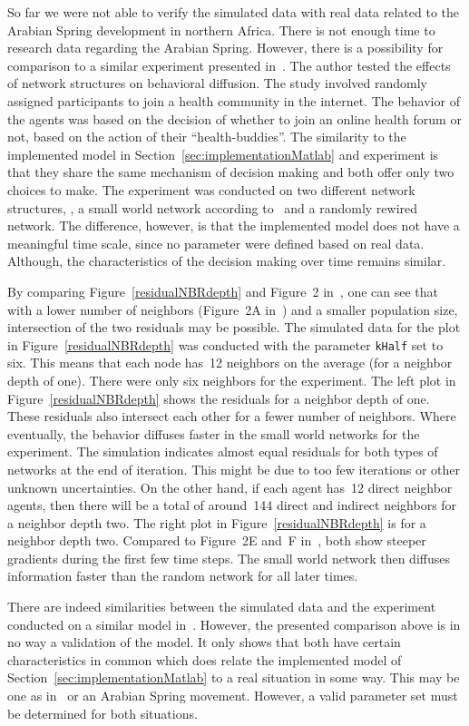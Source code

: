 So far we were not able to verify the simulated data with real data related to
the Arabian Spring development in northern Africa.  There is not enough time to
research data regarding the Arabian Spring.  However, there is a possibility
for comparison to a similar experiment presented in~\cite{centola2010spread}.
The author tested the effects of network structures on behavioral diffusion.
The study involved randomly assigned participants to join a health community in
the internet.  The behavior of the agents was based on the decision of whether
to join an online health forum or not, based on the action of their
``health-buddies''.  The similarity to the implemented model in
Section~\ref{sec:implementationMatlab} and experiment is that they share the
same mechanism of decision making and both offer only two choices to make.  The
experiment was conducted on two different network structures, \ie, a small
world network according to~\cite{watts98} and a randomly rewired network.  The
difference, however, is that the implemented model does not have a meaningful
time scale, since no parameter were defined based on real data.  Although, the
characteristics of the decision making over time remains similar.

By comparing Figure~\ref{residualNBRdepth} and Figure~2
in~\cite{centola2010spread}, one can see that with a lower number of neighbors
(Figure~2A in~\cite{centola2010spread}) and a smaller population size,
intersection of the two residuals may be possible.  The simulated data for the
plot in Figure~\ref{residualNBRdepth} was conducted with the parameter
\texttt{kHalf} set to six.  This means that each node has~12 neighbors on the
average (for a neighbor depth of one).  There were only six neighbors for the
experiment.  The left plot in Figure~\ref{residualNBRdepth} shows the residuals
for a neighbor depth of one.  These residuals also intersect each other for a
fewer number of neighbors.  Where eventually, the behavior diffuses faster in
the small world networks for the experiment.  The simulation indicates almost
equal residuals for both types of networks at the end of iteration.  This might
be due to too few iterations or other unknown uncertainties.  On the other
hand, if each agent has~12 direct neighbor agents, then there will be a total
of around~144 direct and indirect neighbors for a neighbor depth two.  The
right plot in Figure~\ref{residualNBRdepth} is for a neighbor depth two.
Compared to Figure~2E and~F in~\cite{centola2010spread}, both show steeper
gradients during the first few time steps.  The small world network then
diffuses information faster than the random network for all later times.

There are indeed similarities between the simulated data and the experiment
conducted on a similar model in~\cite{centola2010spread}.  However, the
presented comparison above is in no way a validation of the model.  It only
shows that both have certain characteristics in common which does relate the
implemented model of Section~\ref{sec:implementationMatlab} to a real situation
in some way.  This may be one as in~\cite{centola2010spread} or an Arabian
Spring movement.  However, a valid parameter set must be determined for both
situations.

